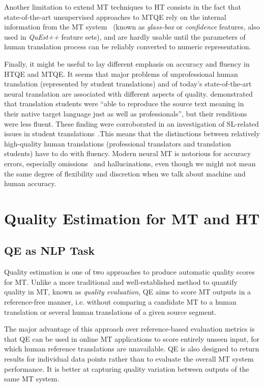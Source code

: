 Another limitation to extend MT techniques to HT consists in the fact that state-of-the-art unsupervised approaches to \gls{MTQE} rely on the internal information from the MT system~\cite{Fomicheva2020} (known as \textit{glass-box} or \textit{confidence} features, also used in \textit{QuEst++} feature sets), and are hardly usable until the parameters of human translation process can be reliably converted to numeric representation.

Finally, it might be useful to lay different emphasis on accuracy and fluency in HTQE and MTQE. It seems that major problems of unprofessional human translation (represented by student translations) and of today's state-of-the-art neural translation are associated with different aspects of quality. \citet{Carl2010} demonstrated that translation students were ``able to reproduce the source text meaning in their native target language just as well as professionals'', but their renditions were less fluent. These finding were corroborated in an investigation of SL-related issues in student translations~\cite{Kunilovskaya2023err}.This means that the distinctions between relatively high-quality human translations (professional translators and translation students) have to do with fluency. 
Modern neural MT is notorious for accuracy errors, especially omissions~\cite[see, for example,][]{vanBrussel2018} and hallucinations, even though we might not mean the same degree of flexibility and discretion when we talk about machine and human accuracy.

\section{\label{sec:qe}Quality Estimation for MT and HT}
\subsection{\label{ssec:task}QE as NLP Task}
Quality estimation is one of two approaches to produce automatic quality scores for MT.
Unlike a more traditional and well-established method to quantify quality in MT, known as \textit{quality evaluation}, \gls{QE} aims to score MT outputs in a reference-free manner, i.e. without comparing a candidate MT to a human translation or several human translations of a given source segment. 

The major advantage of this approach over reference-based evaluation metrics is that QE can be used in online MT applications to score entirely unseen input, for which human reference translations are unavailable. QE is also designed to return results for individual data points rather than to evaluate the overall MT system performance. It is better at capturing quality variation between outputs of the same MT system. 

